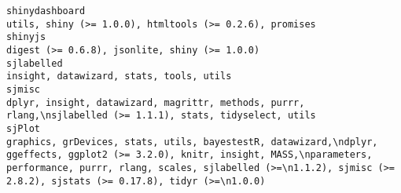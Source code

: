 \documentclass[
  letterpaper,
  DIV=11,
  numbers=noendperiod]{scrreprt}
\begin{document}
\begin{verbatim}
shinydashboard                                                                                                                                                                                                                                                                                                                                                                                                                                                                                                                                                     utils, shiny (>= 1.0.0), htmltools (>= 0.2.6), promises
shinyjs                                                                                                                                                                                                                                                                                                                                                                                                                                                                                                                                                                      digest (>= 0.6.8), jsonlite, shiny (>= 1.0.0)
sjlabelled                                                                                                                                                                                                                                                                                                                                                                                                                                                                                                                                                                        insight, datawizard, stats, tools, utils
sjmisc                                                                                                                                                                                                                                                                                                                                                                                                                                                                                                       dplyr, insight, datawizard, magrittr, methods, purrr, rlang,\nsjlabelled (>= 1.1.1), stats, tidyselect, utils
sjPlot                                                                                                                                                                                                                                                                                                                                                           graphics, grDevices, stats, utils, bayestestR, datawizard,\ndplyr, ggeffects, ggplot2 (>= 3.2.0), knitr, insight, MASS,\nparameters, performance, purrr, rlang, scales, sjlabelled (>=\n1.1.2), sjmisc (>= 2.8.2), sjstats (>= 0.17.8), tidyr (>=\n1.0.0)

\end{verbatim}
\end{document}
